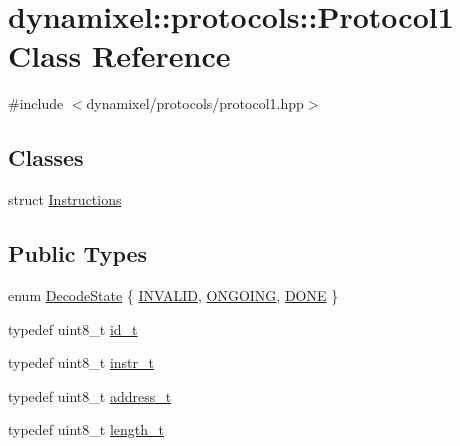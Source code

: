 \hypertarget{classdynamixel_1_1protocols_1_1_protocol1}{}\section{dynamixel\+:\+:protocols\+:\+:Protocol1 Class Reference}
\label{classdynamixel_1_1protocols_1_1_protocol1}


{\ttfamily \#include $<$dynamixel/protocols/protocol1.\+hpp$>$}

\subsection*{Classes}
\begin{DoxyCompactItemize}
\item 
struct \hyperlink{structdynamixel_1_1protocols_1_1_protocol1_1_1_instructions}{Instructions}
\end{DoxyCompactItemize}
\subsection*{Public Types}
\begin{DoxyCompactItemize}
\item 
enum \hyperlink{classdynamixel_1_1protocols_1_1_protocol1_a84867f282d00506d43ebca811925fbcc}{Decode\+State} \{ \hyperlink{classdynamixel_1_1protocols_1_1_protocol1_a84867f282d00506d43ebca811925fbcca2735c69e905cf95470f9e383355a130b}{I\+N\+V\+A\+L\+ID}, 
\hyperlink{classdynamixel_1_1protocols_1_1_protocol1_a84867f282d00506d43ebca811925fbcca527e017e69d1c32dd1cbf06765d71d78}{O\+N\+G\+O\+I\+NG}, 
\hyperlink{classdynamixel_1_1protocols_1_1_protocol1_a84867f282d00506d43ebca811925fbccac417bdba2b956d4e604a2765a656c84c}{D\+O\+NE}
 \}
\item 
typedef uint8\+\_\+t \hyperlink{classdynamixel_1_1protocols_1_1_protocol1_a1d4dfa22b01f80b1876d14f539d52b5c}{id\+\_\+t}
\item 
typedef uint8\+\_\+t \hyperlink{classdynamixel_1_1protocols_1_1_protocol1_a572dc8c0871ecdf3d62c4f58fbcfd454}{instr\+\_\+t}
\item 
typedef uint8\+\_\+t \hyperlink{classdynamixel_1_1protocols_1_1_protocol1_a4383ba392b57ea00dd0273c6da5e8a65}{address\+\_\+t}
\item 
typedef uint8\+\_\+t \hyperlink{classdynamixel_1_1protocols_1_1_protocol1_acd6456c39a2f75de2db3d730941027cc}{length\+\_\+t}
\end{DoxyCompactItemize}
